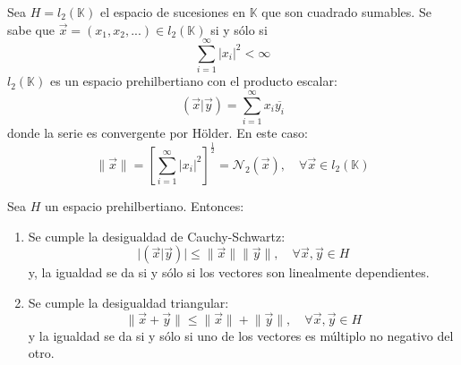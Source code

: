 \documentclass[12pt]{report}
\newcounter{it}
\theoremstyle{largebreak}
\newcommand\abs[1]{\ensuremath{\big|#1\big|}}
\newcommand\norm[1]{\ensuremath{\|#1\|}}
\newcommand\ora[1]{\ensuremath{\vec{#1}}}
\newcommand\pint[2]{\ensuremath{\left(#1\big| #2\right)}}
\newcommand\conj[1]{\ensuremath{\overline{#1}}}
\begin{document}
    \begin{exa}
        Sea $H=l_2(\mathbb{K})$ el espacio de sucesiones en $\mathbb{K}$ que son cuadrado sumables. Se sabe que $\ora{x}=(x_1,x_2,...)\in l_2(\mathbb{K})$ si y sólo si
        \begin{equation*}
            \sum_{i=1}^{\infty}|x_i|^2<\infty
        \end{equation*}
        $l_2(\mathbb{K})$ es un espacio prehilbertiano con el producto escalar:
        \begin{equation*}
            \pint{\ora{x}}{\ora{y}}=\sum_{i=1}^{\infty}x_i\conj{y_i}
        \end{equation*}
        donde la serie es convergente por Hölder. En este caso:
        \begin{equation*}
            \norm{\ora{x}}=\left[\sum_{i=1}^{\infty}\abs{x_i}^2\right]^{\frac{1}{2}}=\mathcal{N}_2(\ora{x}),\quad\forall\ora{x}\in l_2(\mathbb{K})
        \end{equation*}
    \end{exa}

    \begin{theor}
        Sea $H$ un espacio prehilbertiano. Entonces:
        \begin{enumerate}
            \item Se cumple la desigualdad de Cauchy-Schwartz:
            \begin{equation*}
                \abs{\pint{\vec{x}}{\vec{y}}}\leq \norm{\vec{x}}\norm{\vec{y}}, \quad\forall\vec{x},\vec{y}\in H
            \end{equation*}
            y, la igualdad se da si y sólo si los vectores son linealmente dependientes.
            \item Se cumple la desigualdad triangular:
            \begin{equation*}
                \norm{\vec{x}+\vec{y}}\leq\norm{\vec{x}}+\norm{\vec{y}},\quad\forall\vec{x},\vec{y}\in H
            \end{equation*}
            y la igualdad se da si y sólo si uno de los vectores es múltiplo no negativo del otro.
        \end{enumerate}
    \end{theor}
\end{document}
